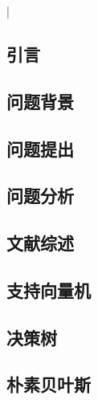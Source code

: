 \documentclass[UTF8,12pt]{hue}
\begin{document}
	
	
	
	
	\thispagestyle{empty}\newpage  
	\thispagestyle{empty}\newpage  
	\begin{center}\tableofcontents|\end{center}\thispagestyle{empty}\newpage  
	
	\pagestyle{fancy}\setcounter{page}{1}
	\fancyhead{}\fancyfoot[R]{}\fancyfoot[L]{}
	

	\begin{center}\item\section{引言}\end{center}
	
	\subsection{问题背景}
	
	\subsection{问题提出}
	
	\subsection{问题分析}
	
	\begin{center}\item\section{文献综述}\end{center}
	
	\subsection{支持向量机}
	
	\subsection{决策树}
	
	\subsection{朴素贝叶斯}
	
\end{document}
